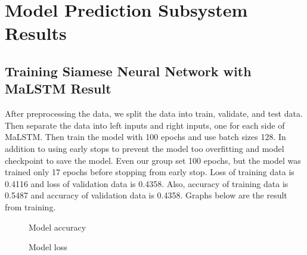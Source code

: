 \documentclass[12pt,oneside,openright,a4paper]{cpe-english-project}
\begin{document}
\section{Model Prediction Subsystem Results}
\subsection{Training Siamese Neural Network with MaLSTM Result}
After preprocessing the data, we split the data into train, validate, and test data. Then separate the data into left inputs and right inputs, one for each side of MaLSTM. Then train the model with 100 epochs and use batch sizes 128. In addition to using early stops to prevent the model too overfitting and model checkpoint to save the model. Even our group set 100 epochs, but the model was trained only 17 epochs before stopping from early stop. Loss of training data is 0.4116 and loss of validation data is 0.4358. Also, accuracy of training data is 0.5487 and accuracy of validation data is 0.4358. Graphs below are the result from training.

\begin{figure}[!h]\centering
{}
\caption{Model accuracy}\label{fig:Model accuracy}
\end{figure}
\begin{figure}[!h]\centering
{}
\caption{Model loss}\label{fig:Model loss}
\end{figure}
\end{document}
